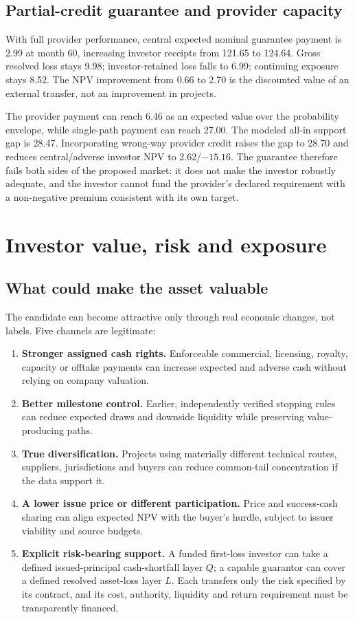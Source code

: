 \documentclass[11pt,a4paper]{article}
\begin{document}
\subsection{Partial-credit guarantee and provider capacity}

With full provider performance, central expected nominal guarantee payment is 2.99 at month 60, increasing investor receipts from 121.65 to 124.64. Gross resolved loss stays 9.98; investor-retained loss falls to 6.99; continuing exposure stays 8.52. The NPV improvement from 0.66 to 2.70 is the discounted value of an external transfer, not an improvement in projects.

The provider payment can reach 6.46 as an expected value over the probability envelope, while single-path payment can reach 27.00. The modeled all-in support gap is 28.47. Incorporating wrong-way provider credit raises the gap to 28.70 and reduces central/adverse investor NPV to 2.62/\(-15.16\). The guarantee therefore fails both sides of the proposed market: it does not make the investor robustly adequate, and the investor cannot fund the provider's declared requirement with a non-negative premium consistent with its own target.

\section{Investor value, risk and exposure}

\subsection{What could make the asset valuable}

The candidate can become attractive only through real economic changes, not labels. Five channels are legitimate:

\begin{enumerate}
  \item \textbf{Stronger assigned cash rights.} Enforceable commercial, licensing, royalty, capacity or offtake payments can increase expected and adverse cash without relying on company valuation.
  \item \textbf{Better milestone control.} Earlier, independently verified stopping rules can reduce expected draws and downside liquidity while preserving value-producing paths.
  \item \textbf{True diversification.} Projects using materially different technical routes, suppliers, jurisdictions and buyers can reduce common-tail concentration if the data support it.
  \item \textbf{A lower issue price or different participation.} Price and success-cash sharing can align expected NPV with the buyer's hurdle, subject to issuer viability and source budgets.
  \item \textbf{Explicit risk-bearing support.} A funded first-loss investor can take a defined issued-principal cash-shortfall layer \(Q\); a capable guarantor can cover a defined resolved asset-loss layer \(L\). Each transfers only the risk specified by its contract, and its cost, authority, liquidity and return requirement must be transparently financed.
\end{enumerate}
\end{document}
